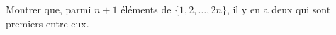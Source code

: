 Montrer que, parmi $n + 1$ éléments de $\{1, 2, \ldots, 2n\}$, il y en a deux qui sont premiers entre eux.
